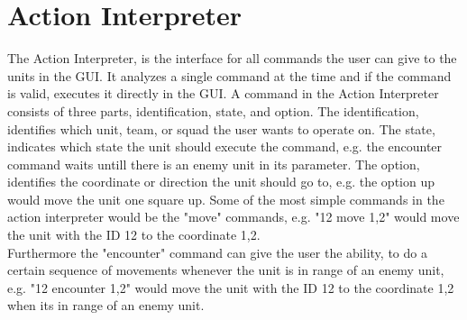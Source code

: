 \section{Action Interpreter}
The Action Interpreter, is the interface for all commands the user can give to the units in the GUI. 
It analyzes a single command at the time and if the command is valid, executes it directly in the GUI.
A command in the Action Interpreter consists of three parts, identification, state, and option.
The identification, identifies which unit, team, or squad the user wants to operate on. 
The state, indicates which state the unit should execute the command, e.g. the encounter command waits untill there is an enemy unit in its parameter. 
The option, identifies the coordinate or direction the unit should go to, e.g. the option up would move the unit one square up.
Some of the most simple commands in the action interpreter would be the "move" commands, e.g. "12 move 1,2" would move the unit with the ID 12 to the coordinate 1,2.
\\
Furthermore the "encounter" command can give the user the ability, to do a certain sequence of movements whenever the unit is in range of an enemy unit, e.g. "12 encounter 1,2" would move the unit with the ID 12 to the coordinate 1,2 when its in range of an enemy unit.



